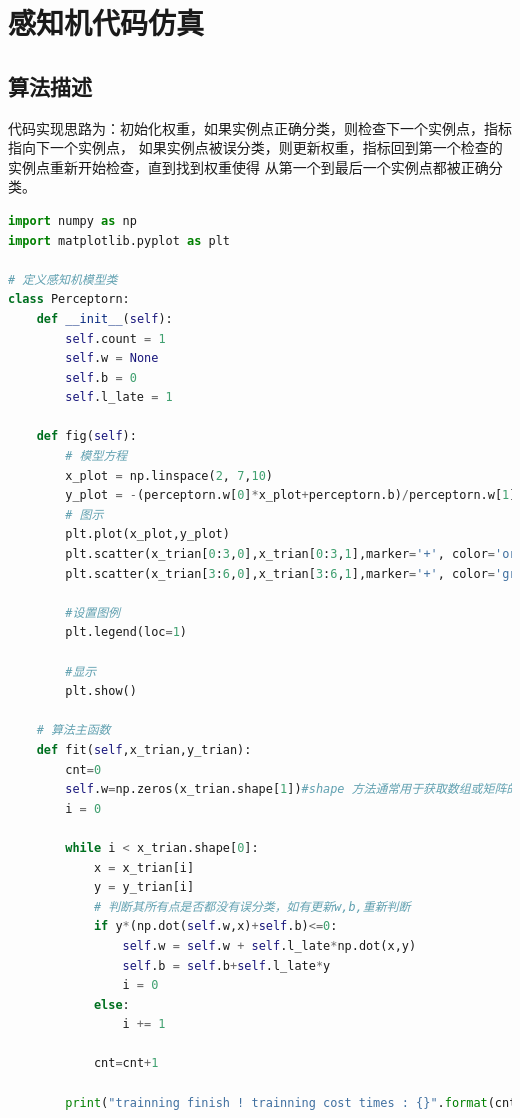 \chapter{感知机代码仿真}

\section{算法描述}

代码实现思路为：初始化权重，如果实例点正确分类，则检查下一个实例点，指标指向下一个实例点，
如果实例点被误分类，则更新权重，指标回到第一个检查的实例点重新开始检查，直到找到权重使得
从第一个到最后一个实例点都被正确分类。

\begin{lstlisting}[language=Python]
import numpy as np
import matplotlib.pyplot as plt

# 定义感知机模型类
class Perceptorn:
    def __init__(self):
        self.count = 1
        self.w = None
        self.b = 0
        self.l_late = 1
    
    def fig(self):
        # 模型方程
        x_plot = np.linspace(2, 7,10)
        y_plot = -(perceptorn.w[0]*x_plot+perceptorn.b)/perceptorn.w[1]
        # 图示
        plt.plot(x_plot,y_plot)
        plt.scatter(x_trian[0:3,0],x_trian[0:3,1],marker='+', color='orange',label='postive')
        plt.scatter(x_trian[3:6,0],x_trian[3:6,1],marker='+', color='green',label='negtive')

        #设置图例
        plt.legend(loc=1)

        #显示
        plt.show()

    # 算法主函数
    def fit(self,x_trian,y_trian):
        cnt=0
        self.w=np.zeros(x_trian.shape[1])#shape 方法通常用于获取数组或矩阵的形状（维度），主要用于 NumPy 库中的数组对象。
        i = 0

        while i < x_trian.shape[0]:
            x = x_trian[i]
            y = y_trian[i]
            # 判断其所有点是否都没有误分类，如有更新w,b,重新判断
            if y*(np.dot(self.w,x)+self.b)<=0:
                self.w = self.w + self.l_late*np.dot(x,y)
                self.b = self.b+self.l_late*y
                i = 0
            else:
                i += 1
                
            cnt=cnt+1
    
        print("trainning finish ! trainning cost times : {}".format(cnt))
            
\end{lstlisting}

